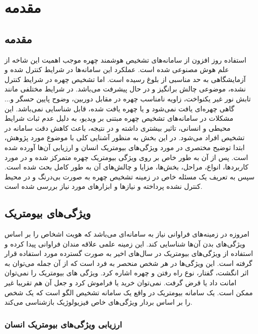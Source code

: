 \chapter{مقدمه}
\section{مقدمه}

استفاده روز افزون از سامانه‌های تشخیص هوشمند چهره موجب اهمیت این شاخه از علم هوش مصنوعی شده است. عملکرد این سامانه‌ها در شرایط کنترل شده و آزمایشگاهی به حد مناسبی از بلوغ رسیده است. اما تشخیص چهره در شرایط کنترل نشده، موضوعی چالش برانگیز و در حال پیشرفت می‌باشد. در شرایط مختلفی مانند تابش نور غیر یکنواخت، زاویه نامناسب چهره در مقابل دوربین، وضوح پایین حسگر و... گاهی چهره‌ای یافت نمی‌شود و یا چهره یافت شده، قابل شناسایی نمی‌باشد. این مشكلات در سامانه‌های تشخیص چهره مبتنی بر ویدیو، به دلیل عدم ثبات شرایط محیطی و انسانی، تاثیر بیشتری داشته و در نتیجه، باعث کاهش دقت سامانه در تشخیص افراد می‌شود.
در این بخش به منظور آشنایی کلی با موضوع مورد پژوهش، ابتدا توضیح مختصری در مورد ویژگی‌های بیومتریک انسان و ارزیابی آن‌ها آورده شده است. پس از آن به طور خاص بر روی ویژگی بیومتریک چهره متمرکز شده و در مورد کاربردها، انواع، مراحل، بخش‌ها، مزایا و چالش‌های آن به طور کامل بحث شده است. سپس به تعریف یک مسئله خاص در زمینه تشخیص چهره به صورت بی‌درنگ و در محیط کنترل نشده پرداخته و نیاز‌ها و ابزارهای مورد نیاز بررسی شده است.

\section{ویژگی‌های بیومتریک}
امروزه در زمینه‌های فراوانی نیاز به سامانه‌ای می‌باشد که هویت اشخاص را بر اساس ویژگی‌های بدن آن‌ها شناسایی کند. این زمینه علمی علاقه مندان فراوانی پیدا کرده و استفاده از ویژگی‌های بیومتریک  در سال‌های اخیر به صورت گسترده مورد استفاده قرار گرفته است. این ویژگی‌ها در هر شخص منحصر به فرد است که از آن جمله می‌توان به اثر انگشت، گفتار، نوع راه رفتن و چهره اشاره کرد. ویژگی های بیومتریک را نمی‌توان امانت داد یا قرض گرفت. نمی‌توان خرید یا فراموش کرد و جعل آن هم تقریبا غیر ممکن است. یک سامانه بیومتریک در واقع یک سامانه تشخیص الگو است که یک شخص را بر اساس بردار ویژگی‌های خاص فیزیولوژیک بازشناسی می‌کند. 

\subsection{ارزیابی ویژگی‌های بیومتریک انسان}

